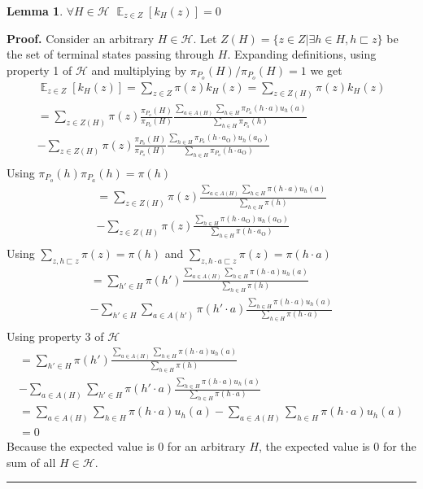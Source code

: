 \documentclass[letterpaper]{article}
\newtheorem{lemma}{Lemma}
\newenvironment{proof}[1][Proof]{\textbf{#1.} }{\ \rule{0.5em}{0.5em}}
\begin{document}
\begin{lemma}
\label{lemma:average-zero}
$\forall H \in \mathcal{H}$ $\mathop{\mathbb{E}}_{z \in Z} [ k_H(z) ] = 0$
\end{lemma}
\begin{proof}
Consider an arbitrary $H \in \mathcal{H}$. Let $Z(H) = \{ z \in Z |
\exists h \in H, h \sqsubset z\}$ be the set of terminal states
passing through $H$. Expanding definitions, using property 1 of
$\mathcal{H}$ and multiplying by $\pi_{P_o}(H)/\pi_{P_o}(H)=1$ we get
\begin{align*}
\mathop{\mathbb{E}}_{z \in Z} [ k_H(z) ] = \sum_{z \in Z} \pi(z)k_H(z) = \sum_{z \in Z(H)} \pi(z)k_H(z) \\
= \sum_{z \in Z(H)} \pi(z) \frac{\pi_{P_o}(H)}{\pi_{P_o}(H)} \frac{\sum_{a \in A(H)} \sum_{h \in H}\pi_{P_a}(h \cdot a)u_h(a)}{\sum_{h \in H} \pi_{P_a}(h)} \\
- \sum_{z \in Z(H)} \pi(z) \frac{\pi_{P_o}(H)}{\pi_{P_o}(H)} \frac{\sum_{h \in H}\pi_{P_a}(h \cdot a_\text{O})u_h(a_\text{O})}{\sum_{h \in H} \pi_{P_a}(h \cdot a_\text{O})} \\
\end{align*}
Using $\pi_{P_o}(h)\pi_{P_a}(h) = \pi(h)$
\begin{align*}
= \sum_{z \in Z(H)} \pi(z)\frac{\sum_{a \in A(H)} \sum_{h \in H} \pi(h \cdot a)u_h(a)}{\sum_{h \in H} \pi(h)} \\
- \sum_{z \in Z(H)} \pi(z)\frac{\sum_{h \in H}\pi(h \cdot a_\text{O})u_h(a_\text{O})}{\sum_{h \in H} \pi(h \cdot a_\text{O})} \\
\end{align*}
Using $\sum_{z,h \sqsubset z} \pi(z) = \pi(h)$ and $\sum_{z,h \cdot a \sqsubset z} \pi(z) = \pi(h \cdot a)$
\begin{align*}
= \sum_{h' \in H} \pi(h')\frac{\sum_{a \in A(H)} \sum_{h \in H}\pi(h \cdot a)u_h(a)}{\sum_{h \in H} \pi(h)} \\
- \sum_{h' \in H} \sum_{a \in A(h')} \pi(h' \cdot a)\frac{\sum_{h \in H}\pi(h \cdot a)u_h(a)}{\sum_{h \in H} \pi(h \cdot a)} \\
\end{align*}
Using property 3 of $\mathcal{H}$
\begin{align*}
= \sum_{h' \in H} \pi(h')\frac{\sum_{a \in A(H)} \sum_{h \in H}\pi(h \cdot a)u_h(a)}{\sum_{h \in H} \pi(h)} \\
- \sum_{a \in A(H)} \sum_{h' \in H} \pi(h' \cdot a)\frac{\sum_{h \in H}\pi(h \cdot a)u_h(a)}{\sum_{h \in H} \pi(h \cdot a)} \\
= \sum_{a \in A(H)} \sum_{h \in H} \pi(h \cdot a)u_h(a)
- \sum_{a \in A(H)} \sum_{h \in H} \pi(h \cdot a)u_h(a) \\
= 0
\end{align*}
Because the expected value is 0 for an arbitrary $H$, the expected
value is 0 for the sum of all $H \in \mathcal{H}$.
\end{proof}
\end{document}
